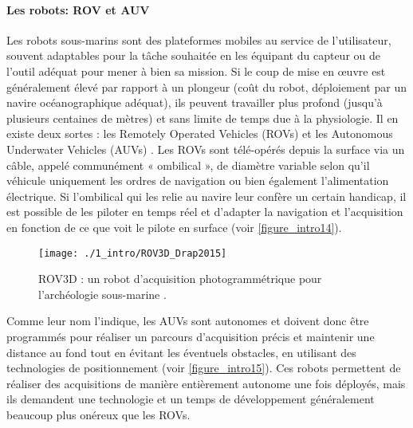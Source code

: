 \paragraph{Les robots: ROV et AUV}

Les robots sous-marins sont des plateformes mobiles au service de l’utilisateur, souvent adaptables pour la tâche souhaitée en les équipant du capteur ou de l’outil adéquat pour mener à bien sa mission. Si le coup de mise en œuvre est généralement élevé par rapport à un plongeur (coût du robot, déploiement par un navire océanographique adéquat), ils peuvent travailler plus profond (jusqu’à plusieurs centaines de mètres) et sans limite de temps due à la physiologie. Il en existe deux sortes : les Remotely Operated Vehicles (ROVs) et les Autonomous Underwater Vehicles (AUVs) \citep{bogue_underwater_2015}. Les ROVs sont télé-opérés depuis la surface via un câble, appelé communément « ombilical », de diamètre variable selon qu’il véhicule uniquement les ordres de navigation ou bien également l’alimentation électrique. Si l’ombilical qui les relie au navire leur confère un certain handicap, il est possible de les piloter en temps réel et d’adapter la navigation et l’acquisition en fonction de ce que voit le pilote en surface (voir \autoref{figure_intro14}).

\begin{figure}[H]
	\begin{center}
	\texttt{[image: ./1\_intro/ROV3D\_Drap2015]}
		\caption[ROV3D : un robot d’acquisition photogrammétrique pour l’archéologie sous-marine]{ROV3D : un robot d’acquisition photogrammétrique pour l’archéologie sous-marine \citep{drap_rov_2015}.}
	\label{figure_intro14}
\end{center}
\end{figure}

Comme leur nom l’indique, les AUVs sont autonomes et doivent donc être programmés pour réaliser un parcours d’acquisition précis et maintenir une distance au fond tout en évitant les éventuels obstacles, en utilisant des technologies de positionnement \citep{johnson-roberson_generation_2010, bonin-font_towards_2016} (voir \autoref{figure_intro15}). Ces robots permettent de réaliser des acquisitions de manière entièrement autonome une fois déployés, mais ils demandent une technologie et un temps de développement généralement beaucoup plus onéreux que les ROVs.

